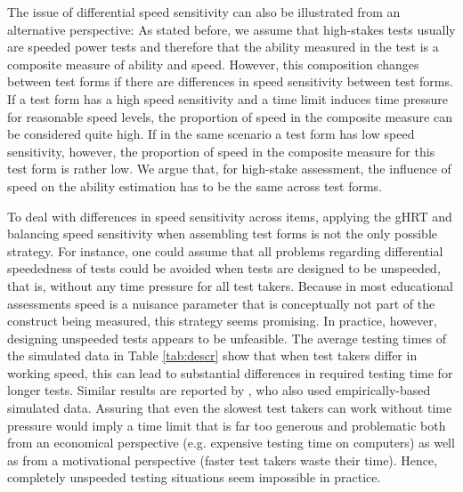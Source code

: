 \documentclass[a4paper,man,apacite,donotrepeattitle]{apa6}
\begin{document}
The issue of differential speed sensitivity can also be illustrated from an alternative perspective: As stated before, we assume that high-stakes tests usually are speeded power tests and therefore that the ability measured in the test is a composite measure of ability and speed. However, this composition changes between test forms if there are differences in speed sensitivity between test forms. If a test form has a high speed sensitivity and a time limit induces time pressure for reasonable speed levels, the proportion of speed in the composite measure can be considered quite high. If in the same scenario a test form has low speed sensitivity, however, the proportion of speed in the composite measure for this test form is rather low. We argue that, for high-stake assessment, the influence of speed on the ability estimation has to be the same across test forms. 

To deal with differences in speed sensitivity across items, applying the gHRT and balancing speed sensitivity when assembling test forms is not the only possible strategy. For instance, one could assume that all problems regarding differential speededness of tests could be avoided when tests are designed to be unspeeded, that is, without any time pressure for all test takers. Because in most educational assessments speed is a nuisance parameter that is conceptually not part of the construct being measured, this strategy seems promising. In practice, however, designing unspeeded tests appears to be unfeasible. The average testing times of the simulated data in Table \ref{tab:descr} show that when test takers differ in working speed, this can lead to substantial differences in required testing time for longer tests. Similar results are reported by , who also used empirically-based simulated data. Assuring that even the slowest test takers can work without time pressure would imply a time limit that is far too generous and problematic both from an economical perspective (e.g. expensive testing time on computers) as well as from a motivational perspective (faster test takers waste their time). Hence, completely unspeeded testing situations seem impossible in practice. 
\end{document}
